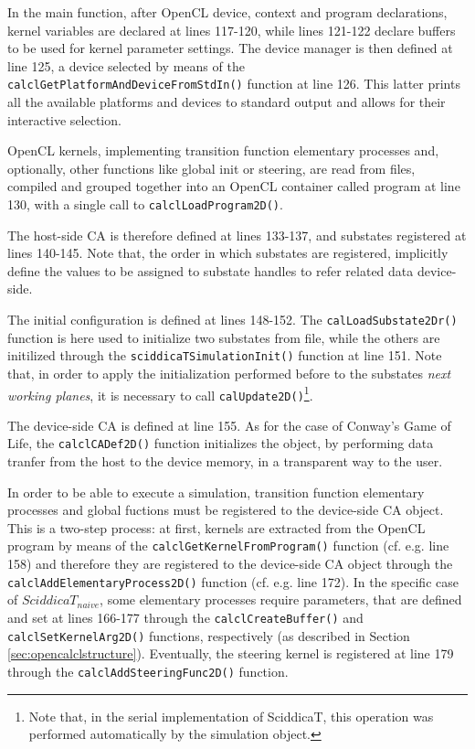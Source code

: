 In the main function, after OpenCL device, context and program
declarations, kernel variables are declared at lines 117-120, while
lines 121-122 declare buffers to be used for kernel parameter
settings.  The device manager is then defined at line 125, a device
selected by means of the \verb'calclGetPlatformAndDeviceFromStdIn()'
function at line 126. This latter prints all the available platforms
and devices to standard output and allows for their interactive
selection.

OpenCL kernels, implementing transition function elementary
processes and, optionally, other functions like global init or
steering, are read from files, compiled and grouped together into an
OpenCL container called program at line 130, with a single call to
\verb'calclLoadProgram2D()'.

The host-side CA is therefore defined at lines 133-137, and
substates registered at lines 140-145. Note that, the order in which
substates are registered, implicitly define the values to be assigned
to substate handles to refer related data device-side.

The initial configuration is defined at lines 148-152. The
\verb'calLoadSubstate2Dr()' function is here used to initialize two
substates from file, while the others are initilized through the
\verb'sciddicaTSimulationInit()' function at line 151. Note that, in
order to apply the initialization performed before to the substates
\emph{next working planes}, it is necessary to call
\verb'calUpdate2D()'\footnote{Note that, in the serial implementation
  of SciddicaT, this operation was performed automatically by the
  simulation object.}.

The device-side CA is defined at line 155. As for the case of Conway's
Game of Life, the \verb'calclCADef2D()' function initializes the
object, by performing data tranfer from the host to the device memory,
in a transparent way to the user.

In order to be able to execute a simulation, transition function
elementary processes and global fuctions must be registered to the
device-side CA object. This is a two-step process: at first, kernels
are extracted from the OpenCL program by means of the
\verb'calclGetKernelFromProgram()' function (cf. e.g. line 158) and
therefore they are registered to the device-side CA object through the
\verb'calclAddElementaryProcess2D()' function (cf. e.g. line 172). In
the specific case of $SciddicaT_{naive}$, some elementary processes require
parameters, that are defined and set at lines 166-177 through the
\verb'calclCreateBuffer()' and \verb'calclSetKernelArg2D()' functions,
respectively (as described in Section
\ref{sec:opencalclstructure}). Eventually, the steering kernel is
registered at line 179 through the \verb'calclAddSteeringFunc2D()'
function.

